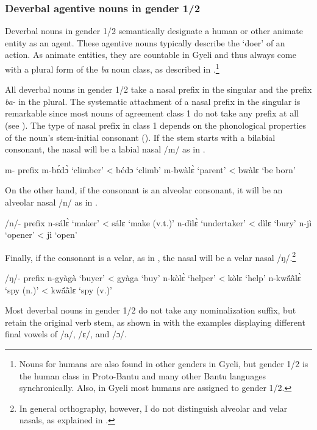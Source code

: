 \subsubsection{Deverbal agentive nouns in gender 1/2}
\label{sec:NOM12}

Deverbal nouns in gender 1/2 semantically designate a human or other animate entity as an agent.
These agentive nouns typically describe the `doer' of an action. As animate entities, they are countable in Gyeli and thus always come with a plural form of the {\itshape ba} noun class, as described in .\footnote{Nouns for humans are also found in other genders in Gyeli, but gender 1/2 is the human class in Proto-Bantu and many other Bantu languages synchronically. Also, in Gyeli most humans are assigned to gender 1/2.}

All deverbal nouns in gender 1/2 take a nasal prefix in the singular and the prefix {\itshape ba}- in the plural. The systematic attachment of a nasal prefix in the singular is remarkable since most nouns of agreement class 1 do not take any prefix at all (see ).
The type of nasal prefix in class 1 depends on the phonological properties of the noun's stem-initial consonant (). If the stem starts with a bilabial consonant, the nasal will be a labial nasal /m/ as in .


\ea \label{prem} m- prefix
\ea  m-bɛ́dɔ̀ `climber' < bédɔ `climb'
\ex m-bwàlɛ̀  `parent' <  bwàlɛ `be born'
\z
\z

\noindent On the other hand, if the consonant is an alveolar consonant, it will be an alveolar nasal /n/ as in .

\ea \label{pren} /n/- prefix
\ea  n-sálɛ̀ `maker' < sálɛ `make (v.t.)'
\ex n-dìlɛ̀ `undertaker' <  dìlɛ `bury'
\ex  n-jì `opener' < jì `open'
\z
\z

\noindent Finally, if the consonant is a velar, as in , the nasal will be a velar nasal /ŋ/.\footnote{In general orthography, however, I do not distinguish alveolar and velar nasals, as explained in .}

\ea \label{preN} /ŋ/- prefix
\ea  n-gyàgà `buyer' <  gyàga `buy'
\ex  n-kòlɛ̀ `helper' <  kòlɛ `help'
\ex n-kwã́ã̀lɛ̀ `spy (n.)' <  kwã́ã̀lɛ `spy (v.)'
\z
\z



Most deverbal nouns in gender 1/2 do not take any nominalization suffix, but retain the original verb stem, as shown in  with the examples displaying different final vowels of /a/, /ɛ/, and /ɔ/.



